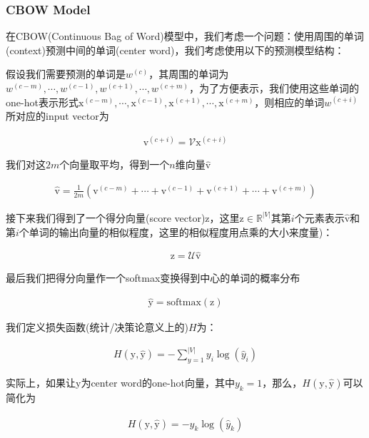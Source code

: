 \documentclass{article}
\begin{document}
\subsubsection*{CBOW Model}

在CBOW(Continuous Bag of Word)模型中，我们考虑一个问题：使用周围的单词(context)预测中间的单词(center word)，我们考虑使用以下的预测模型结构：

假设我们需要预测的单词是$w^{(c)}$，其周围的单词为$w^{(c-m)},\cdots,w^{(c-1)},w^{(c+1)},\cdots,w^{(c+m)}$，为了方便表示，我们使用这些单词的one-hot表示形式$\mathrm{x}^{(c-m)},\cdots,\mathrm{x}^{(c-1)},\mathrm{x}^{(c+1)},\cdots,\mathrm{x}^{(c+m)}$，则相应的单词$w^{(c+i)}$所对应的input vector为

\begin{eqnarray}
\mathrm{v}^{(c+i)}=\mathcal{V} \mathrm{x}^{(c+i)}
\end{eqnarray}

我们对这$2m$个向量取平均，得到一个$n$维向量$\hat{\mathrm{v}}$

\begin{eqnarray}
\hat{\mathrm{v}}=\frac{1}{2m}(\mathrm{v}^{(c-m)}+\cdots+\mathrm{v}^{(c-1)}+\mathrm{v}^{(c+1)}+\cdots+\mathrm{v}^{(c+m)})
\end{eqnarray}

接下来我们得到了一个得分向量(score vector)$\mathrm{z}$，这里$\mathrm{z}\in\mathbb{R}^{\lvert V\rvert}$其第$i$个元素表示$\hat{\mathrm{v}}$和第$i$个单词的输出向量的相似程度，这里的相似程度用点乘的大小来度量)：

\begin{eqnarray}
\mathrm{z}=\mathcal{U}\hat{\mathrm{v}}
\end{eqnarray}

最后我们把得分向量作一个softmax变换得到中心的单词的概率分布

\begin{eqnarray}
\hat{\mathrm{y}} = \mathrm{softmax}(\mathrm{z})
\end{eqnarray}

我们定义损失函数(统计/决策论意义上的)$H$为：

\begin{eqnarray}
H(\mathrm{y},\hat{\mathrm{y}})=-\sum_{y=1}^{\lvert V\rvert}{y_i\log(\hat{y}_i)}
\end{eqnarray}

实际上，如果让$\mathrm{y}$为center word的one-hot向量，其中$y_k=1$，那么，$H(\mathrm{y},\hat{\mathrm{y}})$可以简化为

\begin{eqnarray}
H(\mathrm{y},\hat{\mathrm{y}})=-y_k\log(\hat{y}_k)
\end{eqnarray}
\end{document}
